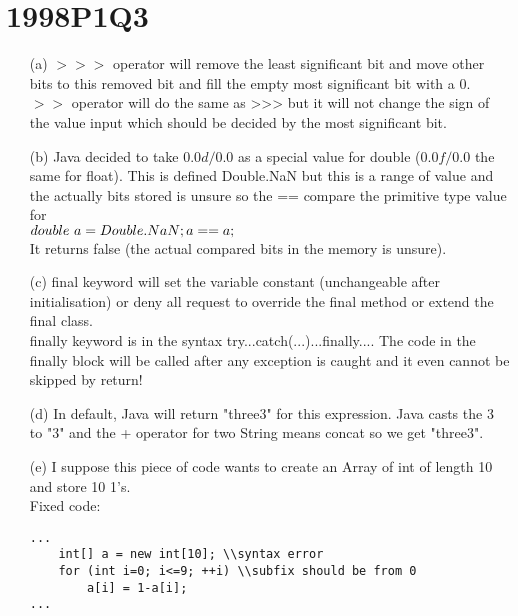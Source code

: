 \documentclass[10pt,twoside,a4paper]{article}
\begin{document}
\section{1998P1Q3}
\begin{enumerate}
\item[(a)]
$>>>$ operator will remove the least significant bit and move other bits to this removed bit and fill the empty most significant bit with a 0.\\
$>>$ operator will do the same as >>> but it will not change the sign of the value input which should be decided by the most significant bit.\\
\item[(b)]
Java decided to take $0.0d/0.0$ as a special value for double ($0.0f/0.0$ the same for float). This is defined Double.NaN but this is a range of value and the actually bits stored is unsure so the == compare the primitive type value for \\
$double\  a =Double.NaN; \\
a==a;$\\
It returns false (the actual compared bits in the memory is unsure).
\item[(c)]
final keyword will set the variable constant (unchangeable after initialisation) or deny all request to override the final method or extend the final class.\\
finally keyword is in the syntax try{...}catch(...){...}finally{...}. The code in the finally block will be called after any exception is caught and it even cannot be skipped by return!
\item[(d)]
In default, Java will return "three3" for this expression. Java casts the 3 to "3" and the + operator for two String means concat so we get "three3".
\item[(e)]
I suppose this piece of code wants to create an Array of int of length 10 and store 10 1's.\\
Fixed code:
\begin{lstlisting}
...
	int[] a = new int[10]; \\syntax error
	for (int i=0; i<=9; ++i) \\subfix should be from 0
		a[i] = 1-a[i];
...
\end{lstlisting}

\end{enumerate}
\end{document}
